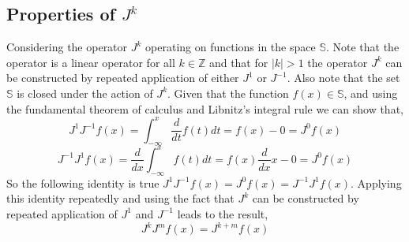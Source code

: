 \documentclass[%
 onecolumn,
 amsmath, amssymb, aps, pra, 10pt
]{revtex4-2}
\begin{document}
\subsection{Properties of $J^k$}
Considering the operator $J^k$ operating on functions in the space $\mathbb{S}$. Note that the operator is a linear operator for all $k \in \mathbb{Z}$ and that for $\left| k \right| > 1$ the operator $J^k$ can be constructed by repeated application of either $J^1$ or $J^{-1}$. Also note that the set $\mathbb{S}$ is closed under the action of $J^k$. Given that the function $f(x) \in \mathbb{S}$, and using the fundamental theorem of calculus and Libnitz’s integral rule we can show that, 
\[J^1J^{-1} f(x) = \int_{-\infty}^x \frac{d}{dt} f(t)dt = f(x) - 0 = J^0 f(x)\]
\[J^{-1}J^1 f(x) = \frac{d}{dx} \int_{-\infty}^x f(t)dt = f(x)\frac{d}{dx}x - 0 = J^0 f(x)\]
So the following identity is true $J^1J^{-1} f(x) = J^0 f(x) = J^{-1}J^1 f(x)$. Applying this identity repeatedly and using the fact that $J^k$ can be constructed by repeated application of $J^1$ and $J^{-1}$ leads to the result,
\begin{equation}
J^kJ^m f(x) = J^{k+m} f(x)
\label{additiveProperty}
\end{equation}



\end{document}
